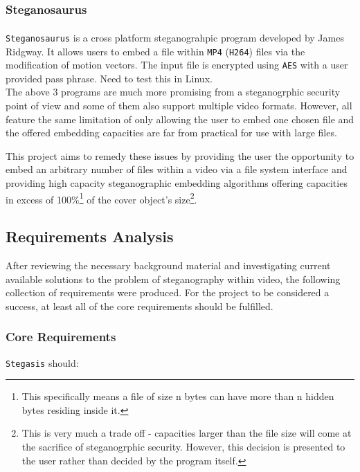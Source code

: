 \documentclass[paper=a4, fontsize=11pt,twoside]{scrartcl}
\numberwithin{table}{section}
\numberwithin{figure}{section}
\numberwithin{algorithm}{section}
\begin{document}
\subsubsection{Steganosaurus}

\texttt{Steganosaurus}\textsuperscript{\cite{steganosaurus}} is a cross platform steganograhpic program developed by James Ridgway. It allows users to embed a file within \texttt{MP4} (\texttt{H264}) files via the modification of motion vectors. The input file is encrypted using \texttt{AES} with a user provided pass phrase. Need to test this in Linux.\\

\noindent
The above 3 programs are much more promising from a steganogrphic security point of view and some of them also support multiple video formats. However, all feature the same limitation of only allowing the user to embed one chosen file and the offered embedding capacities are far from practical for use with large files.

This project aims to remedy these issues by providing the user the opportunity to embed an arbitrary number of files within a video via a file system interface and providing high capacity steganographic embedding algorithms offering capacities in excess of 100\%\footnote{This specifically means a file of size n bytes can have more than n hidden bytes residing inside it.} of the cover object's size\footnote{This is very much a trade off - capacities larger than the file size will come at the sacrifice of steganogrphic security. However, this decision is presented to the user rather than decided by the program itself.}. 

\subsection{Requirements Analysis}

After reviewing the necessary background material and investigating current available solutions to the problem of steganography within video, the following collection of requirements were produced. For the project to be considered a success, at least all of the core requirements should be fulfilled.

\subsubsection{Core Requirements}

\texttt{Stegasis} should:
\end{document}
